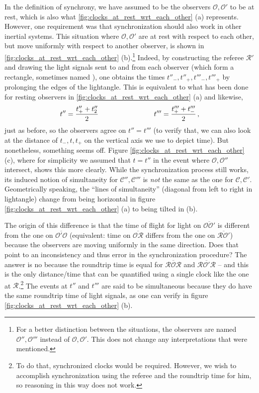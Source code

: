In the definition of synchrony, we have assumed to be the observers $\mathcal{O}, \mathcal{O}'$ to be at rest, which is also what \ref{fig:clocks_at_rest_wrt_each_other} (a) represents. However, one requirement was that synchronization should also work in other inertial systems. This situation where $\mathcal{O}, \mathcal{O}'$ are at rest with respect to each other, but move uniformly with respect to another observer, is shown in \ref{fig:clocks_at_rest_wrt_each_other} (b).\footnote{For a better distinction between the situations, the observers are named $\mathcal{O}'', \mathcal{O}'''$ instead of $\mathcal{O}, \mathcal{O}'$. This does not change any interpretations that were mentioned.} Indeed, by constructing the referee $\mathcal{R}'$ and drawing the light signals sent to and from each observer (which form a rectangle, sometimes named ), one obtains the times $t''_-, t''_+, t'''_-, t'''_+$ by prolonging the edges of the lightangle. This is equivalent to what has been done for resting observers in \ref{fig:clocks_at_rest_wrt_each_other} (a) and likewise,
\begin{equation}
t'' = \frac{t''_+ + t''_2}{2}
\qquad \qquad \qquad \qquad
t''' = \frac{t'''_+ + t'''_-}{2}
\, ,
\end{equation}
just as before, so the observers agree on $ t'' = t'''$ (to verify that, we can also look at the distance of $t_-, t, t_+$ on the vertical axis we use to depict time). But nonetheless, something seems off. Figure \ref{fig:clocks_at_rest_wrt_each_other} (c), where for simplicity we assumed that $t = t''$ in the event where $\mathcal{O}, \mathcal{O}''$ intersect, shows this more clearly. While the synchronization process still works, its induced notion of simultaneity for $\mathcal{C}'', \mathcal{C}'''$ is \emph{not} the same as the one for $\mathcal{C}, \mathcal{C}'$. Geometrically speaking, the \enquote{lines of simultaneity} (diagonal from left to right in lightangle) change from being horizontal in figure \ref{fig:clocks_at_rest_wrt_each_other} (a) to being tilted in (b).


The origin of this difference is that the time of flight for light on $\overline{\mathcal{O} \mathcal{O}'}$ is different from the one on $\overline{\mathcal{O}' \mathcal{O}}$ (equivalent: time on $\overline{\mathcal{O} \mathcal{R}}$ differs from the one on $\overline{\mathcal{R} \mathcal{O}'}$) because the observers are moving uniformly in the same direction. Does that point to an inconsistency and thus error in the synchronization procedure? The answer is no because the roundtrip time is equal for $\overline{\mathcal{R} \mathcal{O} \mathcal{R}}$ and $\overline{\mathcal{R} \mathcal{O}' \mathcal{R}}$ -- and this is the only distance/time that can be quantified using a single clock like the one at $\mathcal{R}$.\footnote{To do that, synchronized clocks would be required. However,  we wish to accomplish synchronization using the referee and the roundtrip time for him, so reasoning in this way does not work.} The events at $t''$ and $t'''$ are said to be simultaneous because they do have the same roundtrip time of light signals, as one can verify in figure \ref{fig:clocks_at_rest_wrt_each_other} (b).




